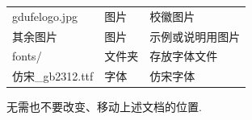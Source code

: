 \begin{table}[!ht]
\begin{tabular}{lll}
        \quad gdufelogo.jpg                 & 图片     & 校徽图片             \\
        \quad 其余图片                          & 图片     & 示例或说明用图片         \\
        fonts/                              & 文件夹    & 存放字体文件           \\
        \quad 仿宋\_gb2312.ttf                & 字体     & 仿宋字体             \\
        \bottomrule
    \end{tabular}
\end{table}

无需也不要改变、移动上述文档的位置.




